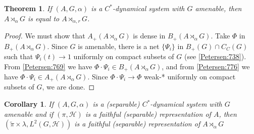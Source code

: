 \documentclass{book}
\newtheorem{theorem}[definition]{Theorem}
\newtheorem{corollary}[definition]{Corollary}
\begin{document}
\begin{theorem}\label{Petersen:777}
  If \((A,G,\alpha)\) is a \(C^*\)-dynamical system with \(G\) amenable, then \(A\rtimes_\alpha G\)
  is equal to \(A\rtimes_{\alpha,r}G\).
\end{theorem}
\begin{proof}
  We must show that \(A_+(A\rtimes_\alpha G)\) is dense in \(B_+(A\rtimes_\alpha G)\).
  Take \(\Phi\) in \(B_+(A\rtimes_\alpha G)\). Since \(G\) is amenable, there is a net \(\{\Psi_i\}\)
  in \(B_+(G)\cap C_C(G)\) such that \(\Psi_i(t)\rightarrow 1\) uniformly on compact subsets of \(G\) (see \ref{Petersen:738}).
  From \ref{Petersen:769} we have \(\Phi\cdot\Psi_i\in B_+(A\rtimes_\alpha G)\), and from \ref{Petersen:776} we have
  \(\Phi\cdot\Psi_i\in A_+(A\rtimes_\alpha G)\).
  Since \(\Phi\cdot\Psi_i\rightarrow \Phi\) weak-* uniformly on compact subsets of \(G\), we are done.
\end{proof}
\begin{corollary}
  If \((A,G,\alpha)\) is a (separable) \(C^*\)-dynamical system with \(G\) amenable and if \((\pi,\mathcal{H})\)
  is a faithful (separable) representation of \(A\), then \((\tilde{\pi}\times\lambda,L^2(G,\mathcal{H}))\)
  is a faithful (separable) representation of \(A\rtimes_\alpha G\)
\end{corollary}
  
\end{document}

